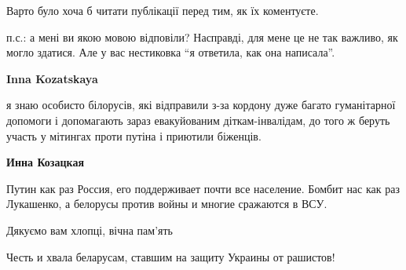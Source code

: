 \begin{itemize}
\begin{itemize}
Варто було хоча б читати публікації перед тим, як їх коментуєте.

п.с.: а мені ви якою мовою відповіли? Насправді, для мене це не так важливо, як
могло здатися. Але у вас нестиковка \enquote{я ответила, как она написала}.

\textbf{Inna Kozatskaya} 

я знаю особисто білорусів, які відправили з-за кордону дуже багато гуманітарної
допомоги і допомагають зараз евакуйованим діткам-інвалідам, до того ж беруть
участь у мітингах проти путіна і приютили біженців.

\textbf{Инна Козацкая} 

Путин как раз Россия, его поддерживает почти все население. Бомбит нас как раз
Лукашенко, а белорусы против войны и многие сражаются в ВСУ.

\end{itemize} %

Дякуємо вам хлопці, вічна пам'ять

Честь и хвала беларусам, ставшим на защиту Украины от рашистов!


\end{itemize} %
